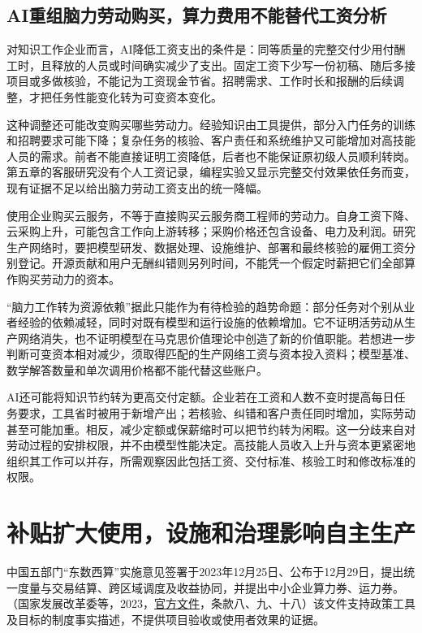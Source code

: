 \documentclass[UTF8,fontset=windows,12pt,a4paper,oneside,openany]{ctexbook}
\begin{document}
\subsection{AI重组脑力劳动购买，算力费用不能替代工资分析}

对知识工作企业而言，AI降低工资支出的条件是：同等质量的完整交付少用付酬工时，且释放的人员或时间确实减少了支出。固定工资下少写一份初稿、随后多接项目或多做核验，不能记为工资现金节省。招聘需求、工作时长和报酬的后续调整，才把任务性能变化转为可变资本变化。

这种调整还可能改变购买哪些劳动力。经验知识由工具提供，部分入门任务的训练和招聘要求可能下降；复杂任务的核验、客户责任和系统维护又可能增加对高技能人员的需求。前者不能直接证明工资降低，后者也不能保证原初级人员顺利转岗。第五章的客服研究没有个人工资记录，编程实验又显示完整交付效果依任务而变，现有证据不足以给出脑力劳动工资支出的统一降幅。

使用企业购买云服务，不等于直接购买云服务商工程师的劳动力。自身工资下降、云采购上升，可能包含工作向上游转移；采购价格还包含设备、电力及利润。研究生产网络时，要把模型研发、数据处理、设施维护、部署和最终核验的雇佣工资分别登记。开源贡献和用户无酬纠错则另列时间，不能凭一个假定时薪把它们全部算作购买劳动力的资本。

“脑力工作转为资源依赖”据此只能作为有待检验的趋势命题：部分任务对个别从业者经验的依赖减轻，同时对既有模型和运行设施的依赖增加。它不证明活劳动从生产网络消失，也不证明模型在马克思价值理论中创造了新的价值职能。若想进一步判断可变资本相对减少，须取得匹配的生产网络工资与资本投入资料；模型基准、数学解答数量和单次调用价格都不能代替这些账户。

AI还可能将知识节约转为更高交付定额。企业若在工资和人数不变时提高每日任务要求，工具省时被用于新增产出；若核验、纠错和客户责任同时增加，实际劳动甚至可能加重。相反，减少定额或保薪缩时可以把节约转为闲暇。这一分歧来自对劳动过程的安排权限，并不由模型性能决定。高技能人员收入上升与资本更紧密地组织其工作可以并存，所需观察因此包括工资、交付标准、核验工时和修改标准的权限。

\section{补贴扩大使用，设施和治理影响自主生产}

中国五部门“东数西算”实施意见签署于2023年12月25日、公布于12月29日，提出统一度量与交易结算、跨区域调度及收益协同，并提出中小企业算力券、运力券。（国家发展改革委等，2023，\href{https://www.ndrc.gov.cn/xxgk/zcfb/tz/202312/t20231229_1363000.html}{官方文件}，条款八、九、十八）该文件支持政策工具及目标的制度事实描述，不提供项目验收或使用者效果的证据。
\end{document}
